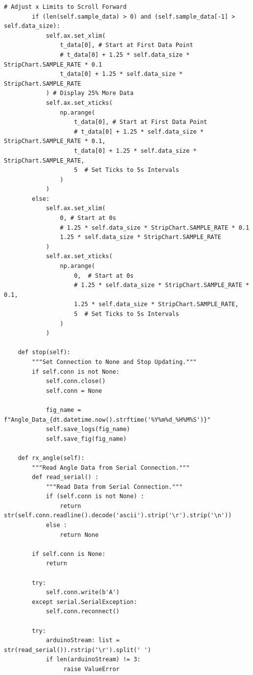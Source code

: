 \documentclass{article}
\begin{document}
\begin{lstlisting}[caption={Python Stripchart}, label={lst:stripchart_code}]
        # Adjust x Limits to Scroll Forward
        if (len(self.sample_data) > 0) and (self.sample_data[-1] > self.data_size):
            self.ax.set_xlim(
                t_data[0], # Start at First Data Point
                # t_data[0] + 1.25 * self.data_size * StripChart.SAMPLE_RATE * 0.1
                t_data[0] + 1.25 * self.data_size * StripChart.SAMPLE_RATE
            ) # Display 25% More Data
            self.ax.set_xticks(
                np.arange(
                    t_data[0], # Start at First Data Point
                    # t_data[0] + 1.25 * self.data_size * StripChart.SAMPLE_RATE * 0.1,
                    t_data[0] + 1.25 * self.data_size * StripChart.SAMPLE_RATE,
                    5  # Set Ticks to 5s Intervals
                )
            )
        else:
            self.ax.set_xlim(
                0, # Start at 0s
                # 1.25 * self.data_size * StripChart.SAMPLE_RATE * 0.1
                1.25 * self.data_size * StripChart.SAMPLE_RATE
            )
            self.ax.set_xticks(
                np.arange(
                    0,  # Start at 0s
                    # 1.25 * self.data_size * StripChart.SAMPLE_RATE * 0.1,
                    1.25 * self.data_size * StripChart.SAMPLE_RATE,
                    5  # Set Ticks to 5s Intervals
                )
            )

    def stop(self):
        """Set Connection to None and Stop Updating."""
        if self.conn is not None:
            self.conn.close()
            self.conn = None

            fig_name = f"Angle_Data_{dt.datetime.now().strftime('%Y%m%d_%H%M%S')}"
            self.save_logs(fig_name)
            self.save_fig(fig_name)

    def rx_angle(self):
        """Read Angle Data from Serial Connection."""
        def read_serial() :
            """Read Data from Serial Connection."""
            if (self.conn is not None) :
                return str(self.conn.readline().decode('ascii').strip('\r').strip('\n'))
            else :
                return None

        if self.conn is None:
            return

        try:
            self.conn.write(b'A')
        except serial.SerialException:
            self.conn.reconnect()

        try:
            arduinoStream: list = str(read_serial()).rstrip('\r').split(' ')
            if len(arduinoStream) != 3:
                 raise ValueError


\end{lstlisting}
\end{document}
